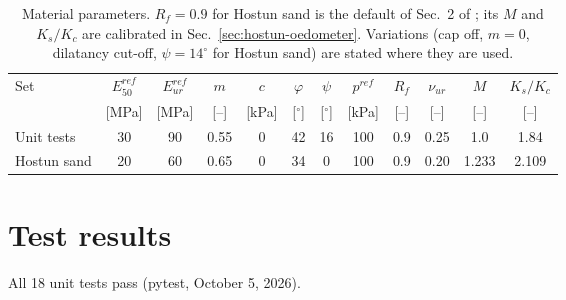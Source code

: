 \documentclass[11pt,a4paper]{article}
\newcommand{\eref}{^{\mathit{ref}}}
\begin{document}
\begin{table}[h]
  \centering
  \caption{Material parameters. $R_f = 0.9$ for Hostun sand is the default of Sec.~2 of \citet{Schanz_1999};
           its $M$ and $K_s/K_c$ are calibrated in Sec.~\ref{sec:hostun-oedometer}. Variations (cap
           off, $m = 0$, dilatancy cut-off, $\psi = 14^\circ$ for Hostun sand) are stated where they
           are used.}
  \label{tab:parameters}
  \small
  \begin{tabular}{lccccccccccc}
    \toprule
    Set & $E_{50}\eref$ & $E_{ur}\eref$ & $m$ & $c$ & $\varphi$ & $\psi$ & $p\eref$ & $R_f$ & $\nu_{ur}$ & $M$ & $K_s/K_c$ \\
        & [MPa] & [MPa] & [--] & [kPa] & [$^\circ$] & [$^\circ$] & [kPa] & [--] & [--] & [--] & [--] \\
    \midrule
    Unit tests   & 30 & 90 & 0.55 & 0 & 42 & 16 & 100 & 0.9 & 0.25 & 1.0   & 1.84  \\
    Hostun sand  & 20 & 60 & 0.65 & 0 & 34 & 0  & 100 & 0.9 & 0.20 & 1.233 & 2.109 \\
    \bottomrule
  \end{tabular}
\end{table}

\section{Test results}

All 18 unit tests pass (pytest, October 5, 2026).
\end{document}
